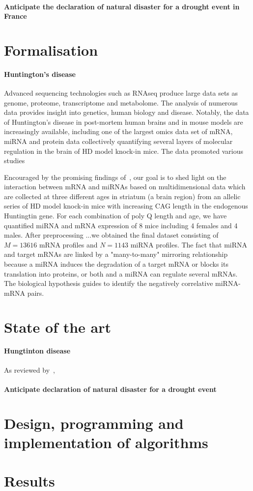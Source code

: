 \paragraph{Anticipate the declaration of natural disaster for a drought event in France}




\section{Formalisation}

\paragraph{Huntington’s disease}
Advanced sequencing technologies such as RNAseq produce large data sets as genome, proteome, transcriptome and metabolome. The analysis of numerous data provides insight into genetics, human biology and disease. Notably, the data of Huntington's disease in post-mortem human brains and in mouse models are increasingly available, including one of the largest omics data set of mRNA, miRNA and protein data collectively quantifying several layers of molecular regulation in the brain of HD model knock-in mice.  The data promoted various studies~\cite{}

Encouraged by the promising findings of~\cite{}, our goal is to shed light on the interaction between mRNA and miRNAs based on multidimensional data which are collected at three different ages in striatum (a brain region) from an allelic series of HD model knock-in mice with increasing CAG length in the endogenous Huntingtin gene.  For each combination of poly Q length and age, we have quantified miRNA and mRNA expression of 8 mice including 4 females and 4 males. After preprocessing ...we obtained the final dataset consisting of $M= 13 616$ mRNA profiles and $N=1143$ miRNA profiles. The fact that miRNA and target mRNAs are linked by a "many-to-many" mirroring relationship because a miRNA induces the degradation of a target mRNA or blocks its translation into proteins, or both and a miRNA can regulate several mRNAs. The biological hypothesis guides to identify the negatively correlative miRNA-mRNA pairs.

\section{State of the art}

\paragraph{Hungtinton disease}

As reviewed by~\cite{NK2021}, 





  
\paragraph{Anticipate declaration of natural disaster for a drought event}


\section{Design, programming and implementation of algorithms}
\section{Results}

